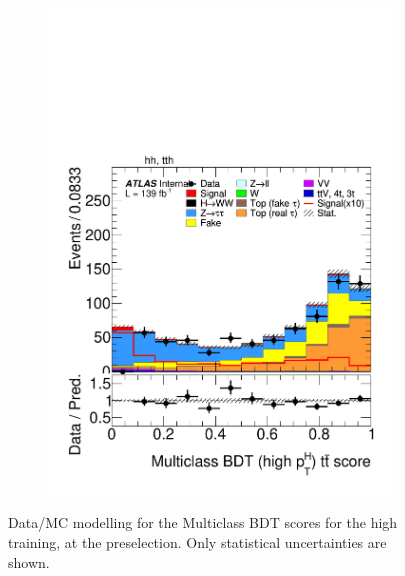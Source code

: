 \begin{figure}[!htbp]
\begin{subfigure}[b]{0.495\textwidth}
    \label{fig:plot_tth_Z_highpt}
  \end{subfigure}%
  \hfill
  \begin{subfigure}[b]{0.495\textwidth}
    \centering
    \includegraphics[width=\linewidth]{images/plots_overtrain_gt200/plot_tth_ttbar_multiclass_gt200_hh_tth.pdf}

    \label{fig:plot_tth_ttbar_highpt}
  \end{subfigure}
  
  \caption{Data/MC modelling for the Multiclass BDT scores for the high \pth training, at the \ttHtt preselection. Only statistical uncertainties are shown.}
  \label{highpt_modelling}
\end{figure}

\FloatBarrier
